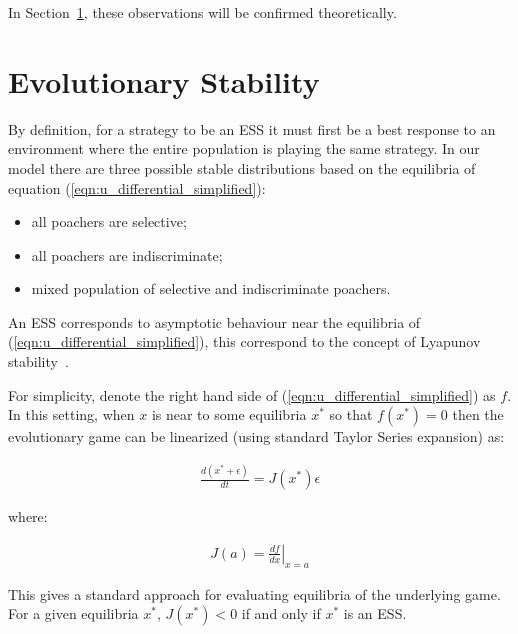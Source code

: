 \documentclass[10pt]{article}
\begin{document}
In Section~\ref{section:evolutionary_stability}, these observations will be
confirmed theoretically.

\section{Evolutionary Stability}\label{section:evolutionary_stability}

By definition, for a strategy to be an ESS it must first be a best response to an
environment where the entire population is playing the same strategy.
In our model there are three possible stable distributions based on the
equilibria of equation (\ref{eqn:u_differential_simplified}):

\begin{itemize}
    \item all poachers are selective;
    \item all poachers are indiscriminate;
    \item mixed population of selective and indiscriminate poachers.
\end{itemize}

An ESS corresponds to asymptotic behaviour near the equilibria of
(\ref{eqn:u_differential_simplified}), this correspond to the concept of
Lyapunov stability~\cite{lyapunov1992general}.

For simplicity, denote the right hand side of
(\ref{eqn:u_differential_simplified}) as \(f\).
In this setting, when \(x\) is near to some equilibria \(x^*\) so that
\(f(x^*)=0\) then the evolutionary game can be linearized (using standard Taylor
Series expansion) as:

\begin{equation}
    \begin{split}
    \frac{d(x^* + \epsilon)}{dt} = J(x^*)\epsilon
    \end{split}
\end{equation}


where:

\begin{equation}
    \begin{split}
    J(a) = \left.\frac{df}{dx}\right|_{x=a}
    \end{split}
\end{equation}


This gives a standard approach for evaluating equilibria of the underlying game.
For a given equilibria \(x^*\), \(J(x^*)<0\) if and only if \(x^*\) is an ESS\@.
\end{document}
